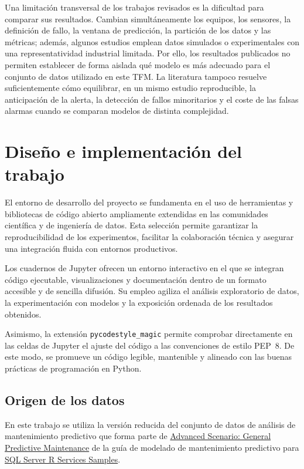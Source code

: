 \documentclass[IB]{TFUOC}
\begin{document}
Una limitación transversal de los trabajos revisados es la dificultad para comparar sus resultados. Cambian
simultáneamente los equipos, los sensores, la definición de fallo, la ventana de predicción, la partición de los datos y
las métricas; además, algunos estudios emplean datos simulados o experimentales con una representatividad industrial
limitada. Por ello, los resultados publicados no permiten establecer de forma aislada qué modelo es más adecuado para el
conjunto de datos utilizado en este TFM. La literatura tampoco resuelve suficientemente cómo equilibrar, en un mismo
estudio reproducible, la anticipación de la alerta, la detección de fallos minoritarios y el coste de las falsas alarmas
cuando se comparan modelos de distinta complejidad.

\chapter{Diseño e implementación del trabajo}

El entorno de desarrollo del proyecto se fundamenta en el uso de herramientas y bibliotecas de código abierto
ampliamente extendidas en las comunidades científica y de ingeniería de datos. Esta selección permite garantizar la
reproducibilidad de los experimentos, facilitar la colaboración técnica y asegurar una integración fluida con entornos
productivos.

Los cuadernos de Jupyter ofrecen un entorno interactivo en el que se integran código ejecutable, visualizaciones y
documentación dentro de un formato accesible y de sencilla difusión. Su empleo agiliza el análisis exploratorio de
datos, la experimentación con modelos y la exposición ordenada de los resultados obtenidos.

Asimismo, la extensión \texttt{pycodestyle\_magic} permite comprobar directamente en las celdas de Jupyter el ajuste del
código a las convenciones de estilo PEP~8. De este modo, se promueve un código legible, mantenible y alineado con las
buenas prácticas de programación en Python.

\section{Origen de los datos}

En este trabajo se utiliza la versión reducida del conjunto de datos de análisis de mantenimiento predictivo que forma
parte de \href{https://github.com/Azure-Samples/MachineLearningSamples-PredictiveMaintenance}{Advanced Scenario: General Predictive Maintenance}
de la guía de modelado de mantenimiento predictivo para \href{https://github.com/microsoft/SQL-Server-R-Services-Samples}{SQL Server R Services Samples}.
\end{document}
